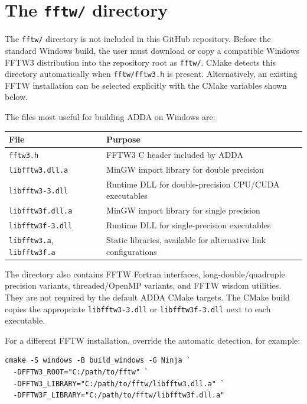 \documentclass[11pt,a4paper]{article}
\newcommand{\code}[1]{\nolinkurl{#1}}
\begin{document}
\section{The \texorpdfstring{\texttt{fftw/}}{fftw/} directory}

The \code{fftw/} directory is not included in this GitHub repository. Before
the standard Windows build, the user must download or copy a compatible
Windows FFTW3 distribution into the repository root as \code{fftw/}. CMake
detects this directory automatically when \code{fftw/fftw3.h} is present.
Alternatively, an existing FFTW installation can be selected explicitly with
the CMake variables shown below.

The files most useful for building ADDA on Windows are:

\begin{longtable}{@{}L{0.30\textwidth}L{0.62\textwidth}@{}}
\toprule
\textbf{File} & \textbf{Purpose} \\
\midrule
\endhead
\code{fftw3.h} & FFTW3 C header included by ADDA \\
\code{libfftw3.dll.a} & MinGW import library for double precision \\
\code{libfftw3-3.dll} & Runtime DLL for double-precision CPU/CUDA executables \\
\code{libfftw3f.dll.a} & MinGW import library for single precision \\
\code{libfftw3f-3.dll} & Runtime DLL for single-precision executables \\
\code{libfftw3.a}, \code{libfftw3f.a} & Static libraries, available for alternative link configurations \\
\bottomrule
\end{longtable}

The directory also contains FFTW Fortran interfaces, long-double/quadruple
precision variants, threaded/OpenMP variants, and FFTW wisdom utilities. They
are not required by the default ADDA CMake targets. The CMake build copies the
appropriate \code{libfftw3-3.dll} or \code{libfftw3f-3.dll} next to each
executable.

For a different FFTW installation, override the automatic detection, for
example:

\begin{lstlisting}
cmake -S windows -B build_windows -G Ninja `
  -DFFTW3_ROOT="C:/path/to/fftw" `
  -DFFTW3_LIBRARY="C:/path/to/fftw/libfftw3.dll.a" `
  -DFFTW3F_LIBRARY="C:/path/to/fftw/libfftw3f.dll.a"
\end{lstlisting}
\end{document}

